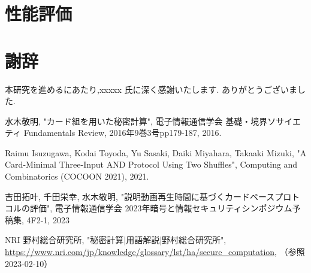 \documentclass[11pt]{jsreport}
\theoremstyle{plain} %
\theoremstyle{definition}
\begin{document}
\chapter{性能評価}

\chapter*{謝辞}
本研究を進めるにあたり,xxxxx 氏に深く感謝いたします. ありがとうございました.

\begin{thebibliography}{99}
水木敬明, "カード組を用いた秘密計算", 電子情報通信学会 基礎・境界ソサイエティ Fundamentals Review, 2016年9巻3号pp179-187, 2016.

Raimu Isuzugawa, Kodai Toyoda, Yu Sasaki, Daiki Miyahara, Takaaki Mizuki, "A Card-Minimal Three-Input AND Protocol Using Two Shuffles", Computing and Combinatorics (COCOON 2021), 2021.



吉田拓叶, 千田栄幸, 水木敬明, "説明動画再生時間に基づくカードベースプロトコルの評価", 電子情報通信学会 2023年暗号と情報セキュリティシンポジウム予稿集, 4F2-1, 2023

NRI 野村総合研究所, "秘密計算|用語解説|野村総合研究所", \url{https://www.nri.com/jp/knowledge/glossary/lst/ha/secure_computation}, （参照2023-02-10）

\end{thebibliography}
\end{document}
